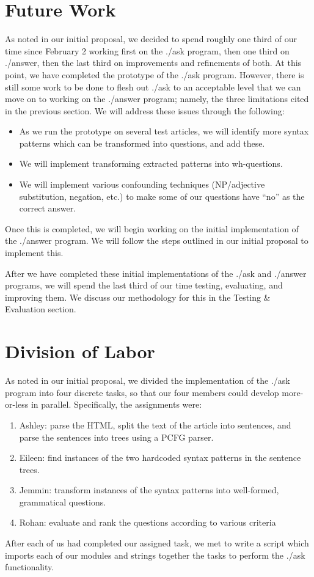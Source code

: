 \documentclass{article}
\begin{document}
\section{Future Work}
As noted in our initial proposal, we decided to spend roughly one third of our time since February 2 working first on the ./ask program, then one third on ./answer, then the last third on improvements and refinements of both. At this point, we have completed the prototype of the ./ask program. However, there is still some work to be done to flesh out ./ask to an acceptable level that we can move on to working on the ./answer program; namely, the three limitations cited in the previous section. We will address these issues through the following:
\begin{itemize}
  \item As we run the prototype on several test articles, we will identify more syntax patterns which can be transformed into questions, and add these.
  \item We will implement transforming extracted patterns into wh-questions.
  \item We will implement various confounding techniques (NP/adjective substitution, negation, etc.) to make some of our questions have ``no'' as the correct answer.
\end{itemize}
Once this is completed, we will begin working on the initial implementation of the ./answer program. We will follow the steps outlined in our initial proposal to implement this.

After we have completed these initial implementations of the ./ask and ./answer programs, we will spend the last third of our time testing, evaluating, and improving them. We discuss our methodology for this in the Testing \& Evaluation section.

\section{Division of Labor}
As noted in our initial proposal, we divided the implementation of the ./ask program into four discrete tasks, so that our four members could develop more-or-less in parallel. Specifically, the assignments were:
\begin{enumerate}
  \item Ashley: parse the HTML, split the text of the article into sentences, and parse the sentences into trees using a PCFG parser.
  \item Eileen: find instances of the two hardcoded syntax patterns in the sentence trees.
  \item Jemmin: transform instances of the syntax patterns into well-formed, grammatical questions.
  \item Rohan: evaluate and rank the questions according to various criteria
\end{enumerate}
After each of us had completed our assigned task, we met to write a script which imports each of our modules and strings together the tasks to perform the ./ask functionality.
\end{document}
